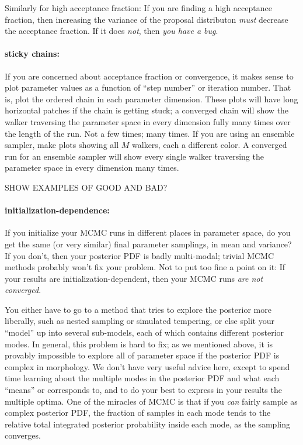 \documentclass[12pt,twoside,pdftex]{article}
\begin{document}
Similarly for high acceptance fraction:
If you are finding a high acceptance fraction,
  then increasing the variance of the proposal distributon \emph{must} decrease the acceptance fraction.
If it does \emph{not}, then \emph{you have a bug}.

\paragraph{sticky chains:}
If you are concerned about acceptance fraction or convergence,
  it makes sense to plot parameter values as a function of ``step number'' or iteration number.
That is, plot the ordered chain in each parameter dimension.
These plots will have long horizontal patches if the chain is getting stuck;
  a converged chain will show the walker traversing the parameter space in every dimension fully many times
  over the length of the run.
Not a few times; many times.
If you are using an ensemble sampler,
  make plots showing all $M$ walkers, each a different color.
A converged run for an ensemble sampler will show every single walker traversing the parameter space
  in every dimension many times.

SHOW EXAMPLES OF GOOD AND BAD?

\paragraph{initialization-dependence:}
If you initialize your MCMC runs in different places in parameter space,
  do you get the same (or very similar) final parameter samplings,
  in mean and variance?
If you don't,
  then your posterior PDF is badly multi-modal;
  trivial MCMC methods probably won't fix your problem.
Not to put too fine a point on it:
If your results are initialization-dependent,
  then your MCMC runs \emph{are not converged}.

You either have to go to a method that tries to explore the posterior
  more liberally, such as nested sampling or simulated tempering,
  or else split your ``model'' up into several sub-models,
  each of which contains different posterior modes.
In general, this problem is hard to fix;
  as we mentioned above, it is provably impossible
  to explore all of parameter space if the posterior PDF is
  complex in morphology.
We don't have very useful advice here, except to
  spend time learning about the multiple modes in the posterior PDF
  and what each ``means'' or corresponds to,
  and to do your best to express in your results the multiple optima.
One of the miracles of MCMC is that if you \emph{can} fairly sample
  as complex posterior PDF,
  the fraction of samples in each mode
  tends to the relative total integrated posterior probability inside each mode,
  as the sampling converges.
\end{document}

